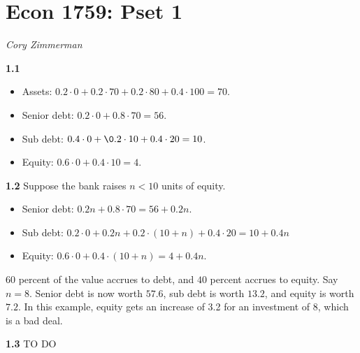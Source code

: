 \documentclass[11pt]{article}
\begin{document}
        \section*{Econ 1759: Pset 1}
        \textit{Cory Zimmerman}

\textbf{1.1}
\begin{itemize}
  \item Assets: $0.2 \cdot 0 + 0.2 \cdot 70 + 0.2 \cdot 80 + 0.4 \cdot 100 = 70$.
  \item Senior debt: $0.2 \cdot 0 + 0.8 \cdot 70 = 56$. 
  \item Sub debt: $0.4 \cdot 0 + \0.2 \cdot 10 + 0.4 \cdot 20 = 10$.
  \item Equity: $0.6 \cdot 0 + 0.4 \cdot 10 = 4$.
\end{itemize}

\textbf{1.2}
Suppose the bank raises $n < 10$ units of equity. 
\begin{itemize}
  \item Senior debt: $0.2n + 0.8 \cdot 70 = 56 + 0.2n$. 
  \item Sub debt: $0.2 \cdot 0 + 0.2n + 0.2 \cdot (10 + n) + 0.4 \cdot 20 = 10 + 0.4n$
  \item Equity: $0.6 \cdot 0 + 0.4 \cdot (10 + n) = 4 + 0.4n$.
\end{itemize}

$60$ percent of the value accrues to debt, and $40$ percent accrues to equity. Say $n = 8$. Senior debt is now worth $57.6$, sub debt is worth $13.2$, and equity is worth $7.2$. In this example, equity gets an increase of 3.2 for an investment of 8, which is a bad deal.

\textbf{1.3}
TO DO
\end{document}
